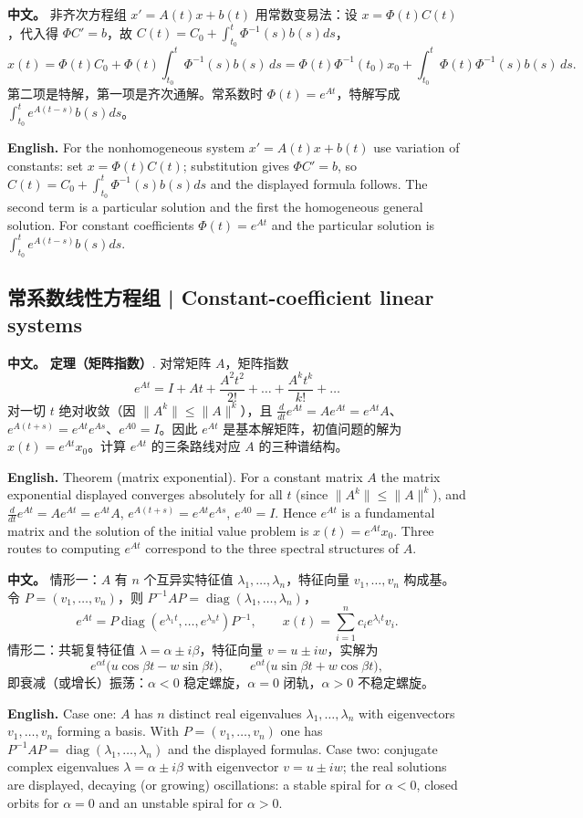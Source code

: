 \documentclass[UTF8,11pt,a4paper]{ctexart}
\newcommand{\APS}[2]{\par\noindent\textbf{中文。} #1\par\noindent\textbf{English.} #2\par}
\begin{document}
\APS{非齐次方程组 $x'=A(t)x+b(t)$ 用常数变易法：设 $x=\Phi(t)C(t)$，代入得 $\Phi C'=b$，故 $C(t)=C_0+\int_{t_0}^{t}\Phi^{-1}(s)b(s)ds$，
\[
x(t)=\Phi(t)C_0+\Phi(t)\int_{t_0}^{t}\Phi^{-1}(s)b(s)\,ds
=\Phi(t)\Phi^{-1}(t_0)x_0+\int_{t_0}^{t}\Phi(t)\Phi^{-1}(s)b(s)\,ds .
\]
第二项是特解，第一项是齐次通解。常系数时 $\Phi(t)=e^{At}$，特解写成 $\int_{t_0}^te^{A(t-s)}b(s)ds$。}{For the nonhomogeneous system $x'=A(t)x+b(t)$ use variation of constants: set $x=\Phi(t)C(t)$; substitution gives $\Phi C'=b$, so $C(t)=C_0+\int_{t_0}^t\Phi^{-1}(s)b(s)ds$ and the displayed formula follows. The second term is a particular solution and the first the homogeneous general solution. For constant coefficients $\Phi(t)=e^{At}$ and the particular solution is $\int_{t_0}^t e^{A(t-s)}b(s)ds$.}
\subsection{常系数线性方程组 | Constant-coefficient linear systems}
\APS{\textbf{定理（矩阵指数）}. 对常矩阵 $A$，矩阵指数
\[
e^{At}=I+At+\frac{A^2t^2}{2!}+\dots+\frac{A^kt^k}{k!}+\dots
\]
对一切 $t$ 绝对收敛（因 $\|A^k\|\le\|A\|^k$），且 $\frac{d}{dt}e^{At}=Ae^{At}=e^{At}A$、$e^{A(t+s)}=e^{At}e^{As}$、$e^{A0}=I$。因此 $e^{At}$ 是基本解矩阵，初值问题的解为 $x(t)=e^{At}x_0$。计算 $e^{At}$ 的三条路线对应 $A$ 的三种谱结构。}{Theorem (matrix exponential). For a constant matrix $A$ the matrix exponential displayed converges absolutely for all $t$ (since $\|A^k\|\le\|A\|^k$), and $\frac{d}{dt}e^{At}=Ae^{At}=e^{At}A$, $e^{A(t+s)}=e^{At}e^{As}$, $e^{A0}=I$. Hence $e^{At}$ is a fundamental matrix and the solution of the initial value problem is $x(t)=e^{At}x_0$. Three routes to computing $e^{At}$ correspond to the three spectral structures of $A$.}
\APS{情形一：$A$ 有 $n$ 个互异实特征值 $\lambda_1,\dots,\lambda_n$，特征向量 $v_1,\dots,v_n$ 构成基。令 $P=(v_1,\dots,v_n)$，则 $P^{-1}AP=\operatorname{diag}(\lambda_1,\dots,\lambda_n)$，
\[
e^{At}=P\operatorname{diag}(e^{\lambda_1t},\dots,e^{\lambda_nt})P^{-1},\qquad x(t)=\sum_{i=1}^{n}c_ie^{\lambda_it}v_i .
\]
情形二：共轭复特征值 $\lambda=\alpha\pm i\beta$，特征向量 $v=u\pm iw$，实解为
\[
e^{\alpha t}\bigl(u\cos\beta t-w\sin\beta t\bigr),\qquad e^{\alpha t}\bigl(u\sin\beta t+w\cos\beta t\bigr),
\]
即衰减（或增长）振荡：$\alpha<0$ 稳定螺旋，$\alpha=0$ 闭轨，$\alpha>0$ 不稳定螺旋。}{Case one: $A$ has $n$ distinct real eigenvalues $\lambda_1,\dots,\lambda_n$ with eigenvectors $v_1,\dots,v_n$ forming a basis. With $P=(v_1,\dots,v_n)$ one has $P^{-1}AP=\operatorname{diag}(\lambda_1,\dots,\lambda_n)$ and the displayed formulas. Case two: conjugate complex eigenvalues $\lambda=\alpha\pm i\beta$ with eigenvector $v=u\pm iw$; the real solutions are displayed, decaying (or growing) oscillations: a stable spiral for $\alpha<0$, closed orbits for $\alpha=0$ and an unstable spiral for $\alpha>0$.}
\end{document}
